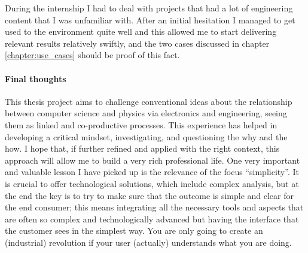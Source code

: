 During the internship I had to deal with projects that had a lot of engineering content that I was unfamiliar with. 
After an initial hesitation I managed to get used to the environment quite well and this allowed me to start delivering relevant results relatively swiftly, 
and the two cases discussed in chapter \ref{chapter:use_cases} should be proof of this fact.

\paragraph{Final thoughts}
This thesis project aims to challenge conventional ideas about the relationship between computer science and physics via electronics and engineering, seeing them as linked and co-productive processes. 
This experience has helped in developing a critical mindset, investigating, and questioning the why and the how. I hope that, if further refined and applied with the right context, this approach will allow me to build a very rich professional life.
One very important and valuable lesson I have picked up is the relevance of the focus ``simplicity''. It is crucial to offer technological solutions, which include complex analysis, 
but at the end the key is to try to make sure that the outcome is simple and clear for the end consumer; 
this means integrating all the necessary tools and aspects that are often so complex and technologically advanced but having the interface that the customer sees in the simplest way. 
You are only going to create an (industrial) revolution if your user (actually) understands what you are doing.
